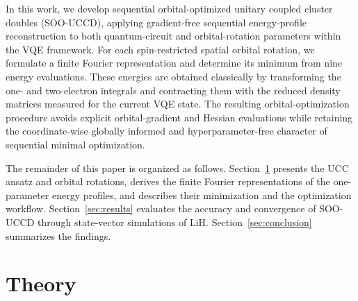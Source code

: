 \documentclass[
 reprint,
 amsmath,amssymb,
 aps,
 physrev,
]{revtex4-2}
\begin{document}
In this work, we develop sequential orbital-optimized unitary coupled cluster doubles (SOO-UCCD), applying gradient-free sequential energy-profile reconstruction to both quantum-circuit and orbital-rotation parameters within the VQE framework. For each spin-restricted spatial orbital rotation, we formulate a finite Fourier representation and determine its minimum from nine energy evaluations. These energies are obtained classically by transforming the one- and two-electron integrals and contracting them with the reduced density matrices measured for the current VQE state. The resulting orbital-optimization procedure avoids explicit orbital-gradient and Hessian evaluations while retaining the coordinate-wise globally informed and hyperparameter-free character of sequential minimal optimization.

The remainder of this paper is organized as follows. Section~\ref{sec:theory} presents the UCC ansatz and orbital rotations, derives the finite Fourier representations of the one-parameter energy profiles, and describes their minimization and the optimization workflow. Section~\ref{sec:results} evaluates the accuracy and convergence of SOO-UCCD through state-vector simulations of LiH. Section~\ref{sec:conclusion} summarizes the findings.

\section{Theory}
\label{sec:theory}
%
\end{document}
